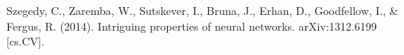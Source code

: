 \documentclass[
	12pt, %
]{../Template/fphw}
\begin{document}

\begin{thebibliography}{9}
Szegedy, C., Zaremba, W., Sutskever, I., Bruna, J., Erhan, D., Goodfellow, I., \& Fergus, R. (2014). Intriguing properties of neural networks. arXiv:1312.6199 [cs.CV].

\end{thebibliography}
\end{document}
